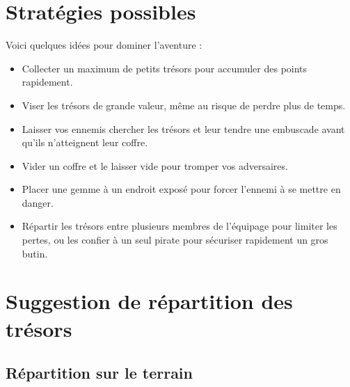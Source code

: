 \documentclass{pirategame}
\begin{document}
\section{Stratégies possibles}
Voici quelques idées pour dominer l'aventure :
\begin{itemize}
  \item Collecter un maximum de petits trésors pour accumuler des points rapidement.
  \item Viser les trésors de grande valeur, même au risque de perdre plus de temps.
  \item Laisser vos ennemis chercher les trésors et leur tendre une embuscade avant qu'ils n'atteignent leur coffre.
  \item Vider un coffre et le laisser vide pour tromper vos adversaires.
  \item Placer une gemme à un endroit exposé pour forcer l’ennemi à se mettre en danger.
  \item Répartir les trésors entre plusieurs membres de l’équipage pour limiter les pertes, ou les confier à un seul pirate pour sécuriser rapidement un gros butin.
\end{itemize}


\section{Suggestion de répartition des trésors}


\subsection{Répartition sur le terrain}
\end{document}
